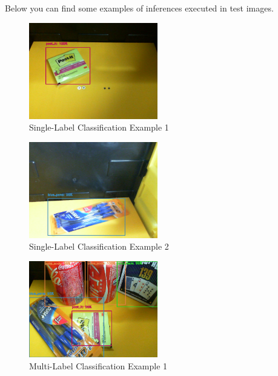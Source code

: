 \documentclass[openright]{normas-utf-tex} %
\begin{document}
Below you can find some examples of inferences executed in test images. 

\begin{figure}[H]
	\centering
	\includegraphics[width=0.5\textwidth]{./images/singlelabel-classification-1.png}
	\caption[Single-Label Classification Example 1]{Single-Label Classification Example 1}
\end{figure}

\begin{figure}[H]
	\centering
	\includegraphics[width=0.5\textwidth]{./images/singlelabel-classification-2.png}
	\caption[Single-Label Classification Example 2]{Single-Label Classification Example 2}
\end{figure}

\begin{figure}[H]
	\centering
	\includegraphics[width=0.5\textwidth]{./images/multilabel-classification-1.png}
	\caption[Multi-Label Classification Example 1]{Multi-Label Classification Example 1}
\end{figure}
\end{document}
